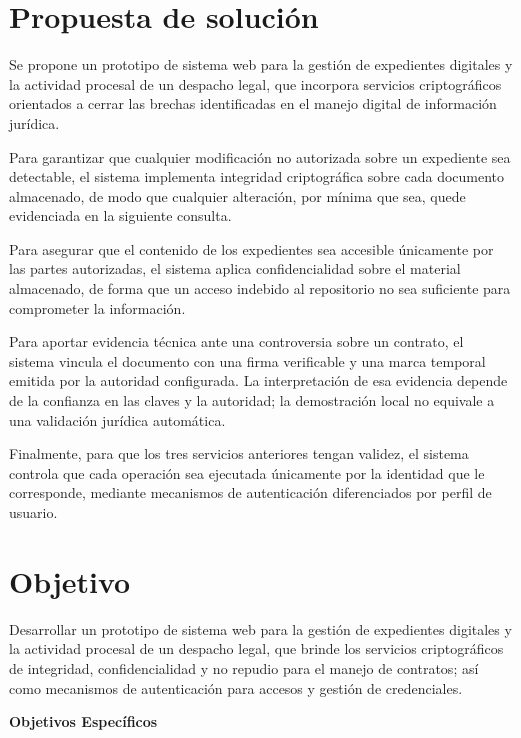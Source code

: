 \section{Propuesta de solución}\label{sec:propuesta-solucion}

Se propone un prototipo de sistema web para la gestión de expedientes digitales y la actividad procesal de un despacho legal, que incorpora servicios criptográficos orientados a cerrar las brechas identificadas en el manejo digital de información jurídica.

Para garantizar que cualquier modificación no autorizada sobre un expediente sea detectable, el sistema implementa integridad criptográfica sobre cada documento almacenado, de modo que cualquier alteración, por mínima que sea, quede evidenciada en la siguiente consulta.

Para asegurar que el contenido de los expedientes sea accesible únicamente por las partes autorizadas, el sistema aplica confidencialidad sobre el material almacenado, de forma que un acceso indebido al repositorio no sea suficiente para comprometer la información.

Para aportar evidencia técnica ante una controversia sobre un contrato, el sistema vincula el documento con una firma verificable y una marca temporal emitida por la autoridad configurada. La interpretación de esa evidencia depende de la confianza en las claves y la autoridad; la demostración local no equivale a una validación jurídica automática.

Finalmente, para que los tres servicios anteriores tengan validez, el sistema controla que cada operación sea ejecutada únicamente por la identidad que le corresponde, mediante mecanismos de autenticación diferenciados por perfil de usuario.

\section{Objetivo}\label{sec:objetivo}

Desarrollar un prototipo de sistema web para la gestión de expedientes digitales y la actividad procesal de un despacho legal, que brinde los servicios criptográficos de integridad, confidencialidad y no repudio para el manejo de contratos; así como mecanismos de autenticación para accesos y gestión de credenciales.

\textbf{Objetivos Específicos}


